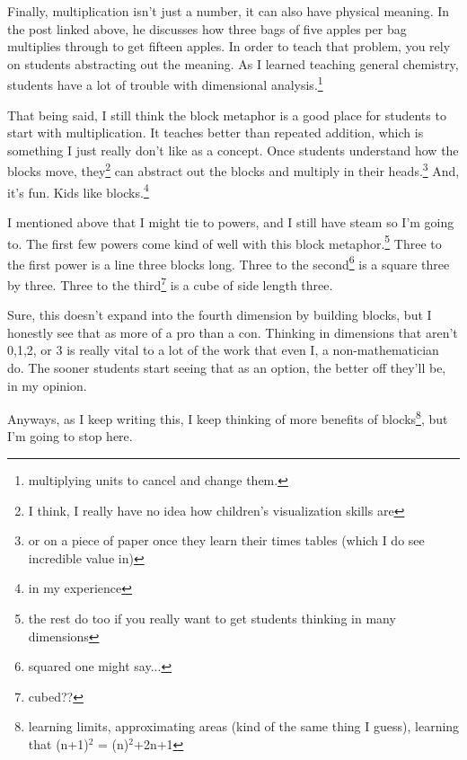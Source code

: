 \documentclass[12pt]{article}[titlepage]
\newcommand{\1}{\={a}}
\newcommand{\2}{\={e}}
\newcommand{\3}{\={\i}}
\newcommand{\4}{\=o}
\newcommand{\5}{\=u}
\newcommand{\6}{\={A}}
\renewcommand{\,}{\textsuperscript{,}}
\begin{document}
Finally, multiplication isn't just a number, it can also have physical meaning.
In the post linked above, he discusses how three bags of five apples per bag multiplies through to get fifteen apples.
In order to teach that problem, you rely on students abstracting out the meaning.
As I learned teaching general chemistry, students have a lot of trouble with dimensional analysis.\footnote{multiplying units to cancel and change them.}

That being said, I still think the block metaphor is a good place for students to start with multiplication.
It teaches better than repeated addition, which is something I just really don't like as a concept.
Once students understand how the blocks move, they\footnote{I think, I really have no idea how children's visualization skills are} can abstract out the blocks and multiply in their heads.\footnote{or on a piece of paper once they learn their times tables (which I do see incredible value in)}
And, it's fun.
Kids like blocks.\footnote{in my experience}

I mentioned above that I might tie to powers, and I still have steam so I'm going to.
The first few powers come kind of well with this block metaphor.\footnote{the rest do too if you really want to get students thinking in many dimensions}
Three to the first power is a line three blocks long.
Three to the second\footnote{squared one might say...} is a square three by three.
Three to the third\footnote{cubed??} is a cube of side length three.

Sure, this doesn't expand into the fourth dimension by building blocks, but I honestly see that as more of a pro than a con.
Thinking in dimensions that aren't 0,1,2, or 3 is really vital to a lot of the work that even I, a non-mathematician do.
The sooner students start seeing that as an option, the better off they'll be, in my opinion.

Anyways, as I keep writing this, I keep thinking of more benefits of blocks\footnote{learning limits, approximating areas (kind of the same thing I guess), learning that (n+1)$^2$ = (n)$^2$+2n+1}, but I'm going to stop here.
\end{document}

